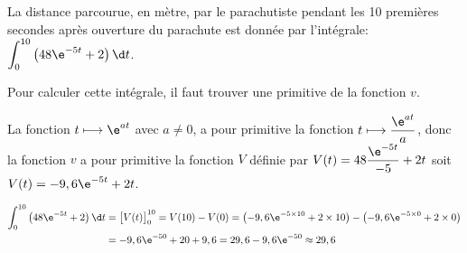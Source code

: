 \documentclass[a4paper,11pt,exos]{nsi}
\begin{document}
La distance parcourue, en mètre, par le parachutiste pendant les 10 premières secondes après ouverture du parachute est donnée  par l'intégrale:
$\displaystyle\int_{0}^{10} \left ( 48 \e^{-5t} +2 \right ) \d t$.

Pour calculer cette intégrale, il faut trouver une primitive de la fonction $v$.

La fonction $t\longmapsto \e^{at}$ avec $a\neq 0$,  a pour primitive la fonction $t\longmapsto \dfrac{\e^{at}}{a}$, donc la fonction $v$ a pour primitive la fonction $V$ définie par $V(t) = 48 \dfrac{\e^{-5t}}{-5} + 2t$ soit $V(t) = - 9,6 \e^{-5t} +2t$.

$\begin{aligned}
\displaystyle\int_{0}^{10} \left ( 48 \e^{-5t} +2 \right ) \d t&
= \left [ V(t) \strut\right ]_{0}^{10}
= V(10) - V(0)
= \left (-9,6 \e^{-5\times 10} + 2 \times 10 \right ) - \left ( -9,6 \e^{-5\times 0} + 2 \times 0 \right )\\
&
= -9,6 \e^{-50} + 20+9,6  = 29,6 -9,6 \e^{-50} \approx 29,6
\end{aligned}$
\end{document}
